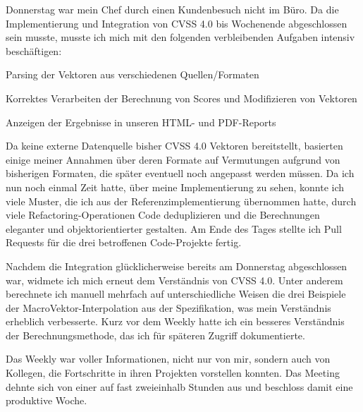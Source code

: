 \sweekdaymarginpar{\weekdayThursdayLong}

Donnerstag war mein Chef durch einen Kundenbesuch nicht im Büro.
Da die Implementierung und Integration von CVSS 4.0 bis Wochenende abgeschlossen sein musste, musste ich mich mit den folgenden verbleibenden Aufgaben intensiv beschäftigen:

\begin{smitemize}
    \item Parsing der Vektoren aus verschiedenen Quellen/Formaten
    \item Korrektes Verarbeiten der Berechnung von Scores und Modifizieren von Vektoren
    \item Anzeigen der Ergebnisse in unseren HTML- und PDF-Reports
\end{smitemize}

Da keine externe Datenquelle bisher CVSS 4.0 Vektoren bereitstellt, basierten einige meiner Annahmen über deren Formate auf Vermutungen aufgrund von bisherigen Formaten, die später eventuell noch angepasst werden müssen.
Da ich nun noch einmal Zeit hatte, über meine Implementierung zu sehen, konnte ich viele Muster, die ich aus der Referenzimplementierung übernommen hatte, durch viele Refactoring-Operationen Code deduplizieren und die Berechnungen eleganter und objektorientierter gestalten.
Am Ende des Tages stellte ich Pull Requests für die drei betroffenen Code-Projekte fertig.

\sweekdaymarginpar{\weekdayFridayLong}

Nachdem die Integration glücklicherweise bereits am Donnerstag abgeschlossen war, widmete ich mich erneut dem Verständnis von CVSS 4.0.
Unter anderem berechnete ich manuell mehrfach auf unterschiedliche Weisen die drei Beispiele der MacroVektor-Interpolation aus der Spezifikation, was mein Verständnis erheblich verbesserte.
Kurz vor dem Weekly hatte ich ein besseres Verständnis der Berechnungsmethode, das ich für späteren Zugriff dokumentierte.

Das Weekly war voller Informationen, nicht nur von mir, sondern auch von Kollegen, die Fortschritte in ihren Projekten vorstellen konnten.
Das Meeting dehnte sich von einer auf fast zweieinhalb Stunden aus und beschloss damit eine produktive Woche.
